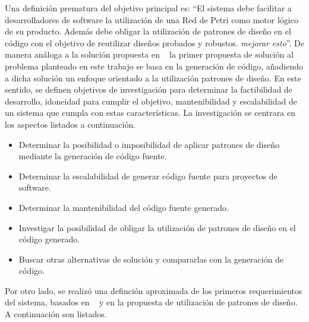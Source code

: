 Una definición prematura del objetivo principal es:
``El sistema debe facilitar a desarrolladores de software la utilización de una
Red de Petri como motor lógico de su producto. Además debe obligar la
utilización de patrones de diseño en el código con el objetivo de reutilizar
diseños probados y robustos. \emph{\color{red}mejorar esto}''.
De manera análoga a la solución propuesta en ~\cite{codegen} la primer propuesta
de solución al problema planteado en este trabajo se basa en la generación de
código, añadiendo a dicha solución un enfoque orientado a la utilización patrones de diseño.
 En este sentido, se definen objetivos de investigación para determinar la
 factibilidad de desarrollo, idoneidad para cumplir el objetivo, mantenibilidad
 y escalabilidad de un sistema que cumpla con estas características. La investigación se centrara en los aspectos
 listados a continuación.
\begin{itemize}
    \item Determinar la posibilidad o imposibilidad de aplicar patrones de
    diseño mediante la generación de código fuente.
    \item Determinar la escalabilidad de generar código fuente para proyectos
    de software.
    \item Determinar la mantenibilidad del código fuente generado.
    \item Investigar la posibilidad de obligar la utilización de patrones
    de diseño en el código generado.
    \item Buscar otras alternativas de solución y compararlas con la generación
    de código.
\end{itemize}
Por otro lado, se realizó una definción aproximada de los primeros
requerimientos del sistema, basados en ~\cite{codegen} y en la propuesta
de utilización de patrones de diseño. A continuación son listados.
